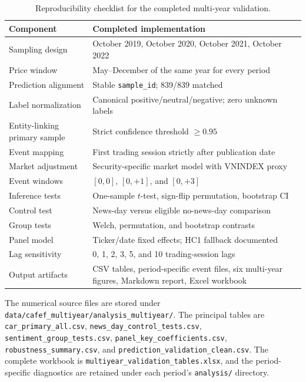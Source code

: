 \documentclass[12pt,a4paper]{article}
\begin{document}
\begin{table}[htbp]
\centering
\small
\caption{Reproducibility checklist for the completed multi-year validation.}
\label{tab:reproducibility-multi-year}
\begin{tabular}{p{}p{}}
\toprule
\textbf{Component} & \textbf{Completed implementation} \\
\midrule
Sampling design & October 2019, October 2020, October 2021, October 2022 \\
Price window & May--December of the same year for every period \\
Prediction alignment & Stable \texttt{sample\_id}; 839/839 matched \\
Label normalization & Canonical positive/neutral/negative; zero unknown labels \\
Entity-linking primary sample & Strict confidence threshold $\geq 0.95$ \\
Event mapping & First trading session strictly after publication date \\
Market adjustment & Security-specific market model with VNINDEX proxy \\
Event windows & $[0,0]$, $[0,+1]$, and $[0,+3]$ \\
Inference tests & One-sample $t$-test, sign-flip permutation, bootstrap CI \\
Control test & News-day versus eligible no-news-day comparison \\
Group tests & Welch, permutation, and bootstrap contrasts \\
Panel model & Ticker/date fixed effects; HC1 fallback documented \\
Lag sensitivity & 0, 1, 2, 3, 5, and 10 trading-session lags \\
Output artifacts & CSV tables, period-specific event files, six multi-year figures, Markdown report, Excel workbook \\
\bottomrule
\end{tabular}
\end{table}

The numerical source files are stored under \texttt{data/cafef\_multiyear/analysis\_multiyear/}. The principal tables are \texttt{car\_primary\_all.csv}, \texttt{news\_day\_control\_tests.csv}, \texttt{sentiment\_group\_tests.csv}, \texttt{panel\_key\_coefficients.csv}, \texttt{robustness\_summary.csv}, and \texttt{prediction\_validation\_clean.csv}. The complete workbook is \texttt{multiyear\_validation\_tables.xlsx}, and the period-specific diagnostics are retained under each period's \texttt{analysis/} directory.
\end{document}
